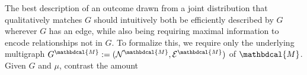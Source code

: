 \documentclass{article}
\theoremstyle{plain}
\theoremstyle{definition}
\theoremstyle{remark}
\newcommand{\todo}[1]{{\color{red}\ \!\Large\smash{\textbf{[}}{\normalsize\textsc{todo:} #1}\ \!\smash{\textbf{]}}}}
\newcommand{\N}{\mathcal N}
\newcommand{\Ed}{\mathcal E}
\newcommand{\dg}[1]{\mathbdcal{#1}}
\numberwithin{equation}{section}
\begin{document}
The best description of an outcome drawn from a joint distribution that 
qualitatively matches $G$ should intuitively both be efficiently
described by  
$G$ wherever $G$ has an edge,
while also being requiring maximal information to encode relationships not in $G$.
To formalize this, we require only the underlying multigraph $G^{\dg M} :=
(\N^{\dg M}, \Ed^{\dg M})$ of $\dg M$. 
Given $G$ and $\mu$, contrast the amount
\end{document}

